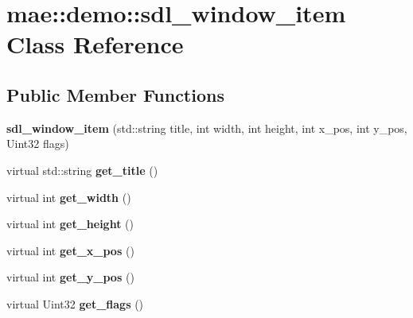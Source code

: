 \hypertarget{classmae_1_1demo_1_1sdl__window__item}{\section{mae\-:\-:demo\-:\-:sdl\-\_\-window\-\_\-item Class Reference}
\label{classmae_1_1demo_1_1sdl__window__item}
}
\subsection*{Public Member Functions}
\begin{DoxyCompactItemize}
\item 
\hypertarget{classmae_1_1demo_1_1sdl__window__item_ad36eb63c7482082eaaf711ae02585bc2}{{\bfseries sdl\-\_\-window\-\_\-item} (std\-::string title, int width, int height, int x\-\_\-pos, int y\-\_\-pos, Uint32 flags)}\label{classmae_1_1demo_1_1sdl__window__item_ad36eb63c7482082eaaf711ae02585bc2}

\item 
\hypertarget{classmae_1_1demo_1_1sdl__window__item_a1c004e8cf8747b832e02cc51f0a72b98}{virtual std\-::string {\bfseries get\-\_\-title} ()}\label{classmae_1_1demo_1_1sdl__window__item_a1c004e8cf8747b832e02cc51f0a72b98}

\item 
\hypertarget{classmae_1_1demo_1_1sdl__window__item_a240121531269eb85c3a16eb0211fb5c6}{virtual int {\bfseries get\-\_\-width} ()}\label{classmae_1_1demo_1_1sdl__window__item_a240121531269eb85c3a16eb0211fb5c6}

\item 
\hypertarget{classmae_1_1demo_1_1sdl__window__item_adef11435c4b2ff565a93b8d604066e43}{virtual int {\bfseries get\-\_\-height} ()}\label{classmae_1_1demo_1_1sdl__window__item_adef11435c4b2ff565a93b8d604066e43}

\item 
\hypertarget{classmae_1_1demo_1_1sdl__window__item_ad29e8e44e7de4bb99b77990bc318227d}{virtual int {\bfseries get\-\_\-x\-\_\-pos} ()}\label{classmae_1_1demo_1_1sdl__window__item_ad29e8e44e7de4bb99b77990bc318227d}

\item 
\hypertarget{classmae_1_1demo_1_1sdl__window__item_aee9c4c7f51d96259cea2192feca979dc}{virtual int {\bfseries get\-\_\-y\-\_\-pos} ()}\label{classmae_1_1demo_1_1sdl__window__item_aee9c4c7f51d96259cea2192feca979dc}

\item 
\hypertarget{classmae_1_1demo_1_1sdl__window__item_a68e4d6296dd2e74a391a8ff27497a9c2}{virtual Uint32 {\bfseries get\-\_\-flags} ()}\label{classmae_1_1demo_1_1sdl__window__item_a68e4d6296dd2e74a391a8ff27497a9c2}


\end{DoxyCompactItemize}
